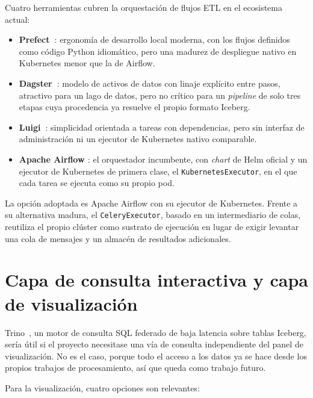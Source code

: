 Cuatro herramientas cubren la orquestación de flujos ETL en el ecosistema
actual:

\begin{itemize}
  \item \textbf{Prefect~\cite{prefect_docs}}: ergonomía de desarrollo
  local moderna, con los flujos definidos como código Python idiomático,
  pero una madurez de despliegue nativo en Kubernetes menor que la de
  Airflow.
  \item \textbf{Dagster~\cite{dagster_docs}}: modelo de activos de datos
  con linaje explícito entre pasos, atractivo para un lago de datos, pero
  no crítico para un \textit{pipeline} de solo tres etapas cuya
  procedencia ya resuelve el propio formato Iceberg.
  \item \textbf{Luigi~\cite{luigi_github}}: simplicidad orientada a
  tareas con dependencias, pero sin interfaz de administración ni un
  ejecutor de Kubernetes nativo comparable.
  \item \textbf{Apache Airflow \cite{apache_airflow_k8s_docs}}: el
  orquestador incumbente, con \textit{chart} de Helm oficial y un
  ejecutor de Kubernetes de primera clase, el \texttt{KubernetesExecutor},
  en el que cada tarea se ejecuta como su propio pod.
\end{itemize}

La opción adoptada es Apache Airflow con su ejecutor de Kubernetes. Frente
a su alternativa madura, el \texttt{CeleryExecutor}, basado en un
intermediario de colas, reutiliza el propio clúster como sustrato de
ejecución en lugar de exigir levantar una cola de mensajes y un almacén
de resultados adicionales.

\section{Capa de consulta interactiva y capa de visualización}
\label{sec:estado_arte_bi}

Trino~\cite{trino_docs}, un motor de consulta SQL federado de baja
latencia sobre tablas Iceberg, sería útil si el proyecto necesitase una
vía de consulta independiente del panel de visualización. No es el caso,
porque todo el acceso a los datos ya se hace desde los propios trabajos de
procesamiento, así que queda como trabajo futuro.

Para la visualización, cuatro opciones son relevantes:

